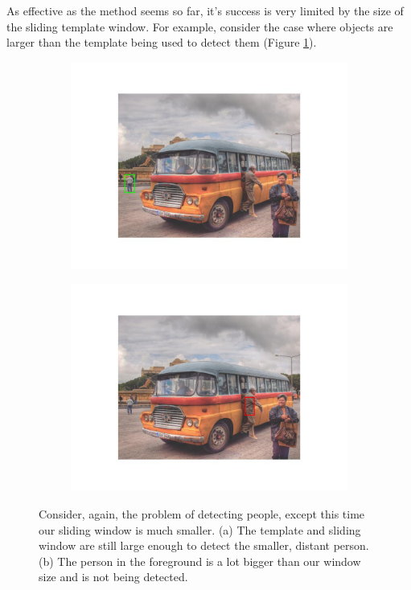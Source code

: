 \documentclass{article}
\begin{document}
As effective as the method seems so far, it's success is very limited by the size of the sliding template window. For example, consider the case where objects are larger than the template being used to detect them (Figure \ref{fig:small_sliding_window}).

\begin{figure}[h]
  \begin{subfigure}{0.48\textwidth}
    \includegraphics[width=\linewidth]{small_sliding_window_a.jpg}
    \caption{}
  \end{subfigure}
  \hspace*{\fill} %
  \begin{subfigure}{0.48\textwidth}
    \includegraphics[width=\linewidth]{small_sliding_window_b.jpg}
    \caption{}
  \end{subfigure}
  \caption{Consider, again, the problem of detecting people, except this time our sliding window is much smaller. (a) The template and sliding window are still large enough to detect the smaller, distant person. (b) The person in the foreground is a lot bigger than our window size and is not being detected.}
  \label{fig:small_sliding_window}
\end{figure}
\end{document}
